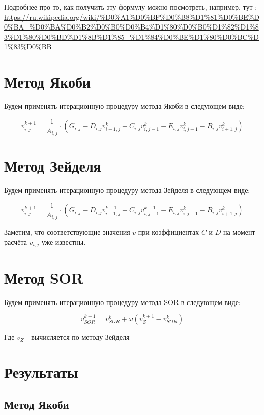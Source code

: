 \documentclass[12pt]{article}
\begin{document}
Подробнее про то, как получить эту формулу можно посмотреть, например, тут :
\url{https://ru.wikipedia.org/wiki/%D0%A1%D0%BF%D0%B8%D1%81%D0%BE%D0%BA_%D0%BA%D0%B2%D0%B0%D0%B4%D1%80%D0%B0%D1%82%D1%83%D1%80%D0%BD%D1%8B%D1%85_%D1%84%D0%BE%D1%80%D0%BC%D1%83%D0%BB}

\section{Метод Якоби}

Будем применять итерационную процедуру метода Якоби в следующем виде:

\begin{equation}
v_{i,j}^{k+1} = \dfrac{1}{A_{i,j}} \cdot (G_{i,j} - D_{i,j}v_{i-1,j}^{k} - C_{i,j}v_{i,j-1}^{k} - E_{i,j}v_{i,j+1}^{k} - B_{i,j}v_{i+1,j}^{k})
\end{equation}

\section{Метод Зейделя}

Будем применять итерационную процедуру метода Зейделя в следующем виде:

\begin{equation}
v_{i,j}^{k+1} = \dfrac{1}{A_{i,j}} \cdot (G_{i,j} - D_{i,j}v_{i-1,j}^{k+1} - C_{i,j}v_{i,j-1}^{k+1} - E_{i,j}v_{i,j+1}^{k} - B_{i,j}v_{i+1,j}^{k})
\end{equation}

Заметим, что соответствующие значения $v$ при коэффициентах $C$ и $D$ на момент расчёта $v_{i,j}$ уже известны.

\section{Метод SOR}

Будем применять итерационную процедуру метода SOR в следующем виде:

\begin{equation}
v_{SOR}^{k+1} = v_{SOR}^{k} + \omega (v_{Z}^{k+1} - v_{SOR}^{k})
\end{equation}

Где $v_{Z}$ - вычисляется по методу Зейделя

\section{Результаты}
\subsection{Метод Якоби}
\end{document}
